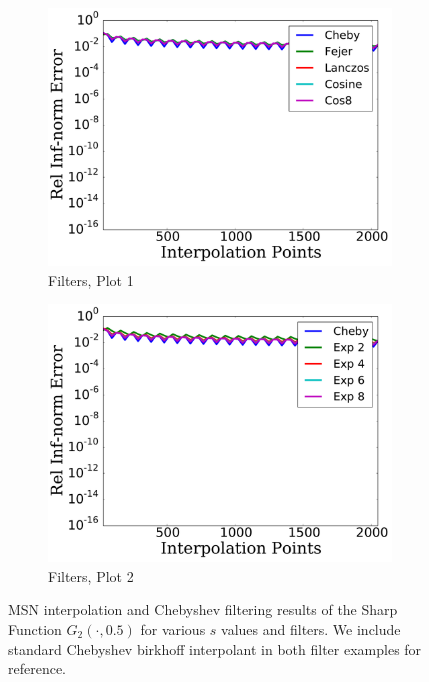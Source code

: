 \begin{figure}[p]
    \begin{subfigure}{0.45\textwidth}
    \includegraphics[width=\textwidth]{plots/cheby_birkhoff_filter_rough_sharp_func_2.pdf}
    \caption{Filters, Plot 1}
    \end{subfigure}
    \begin{subfigure}{0.45\textwidth}
    \includegraphics[width=\textwidth]{plots/cheby_birkhoff_filter_2_rough_sharp_func_2.pdf}
    \caption{Filters, Plot 2}
    \end{subfigure}
\caption[Rough Birkhoff Interpolation Comparison: Sharp Function 2]{
MSN interpolation and Chebyshev filtering results of the Sharp Function
$G_{2}(\cdot,0.5)$ for various $s$ values and filters.
We include standard Chebyshev birkhoff interpolant in both filter
examples for reference.
}
\label{fig:rough_birkhoff_comparison_sharp_func_2}
\end{figure}



